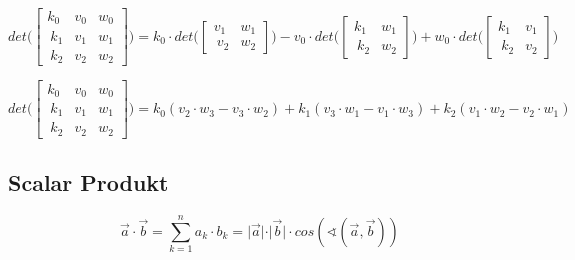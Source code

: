 \begin{equation} 
det \Bigg( \begin{bmatrix}
k_0 & v_0 & w_0 \\\
k_1 & v_1 & w_1 \\\
k_2 & v_2 & w_2
\end{bmatrix} \Bigg) = k_0 \cdot 	det \bigg( \begin{bmatrix}
v_1 & w_1\\\
v_2 & w_2 
\end{bmatrix} \bigg) - v_0 \cdot 	det \bigg( \begin{bmatrix}
k_1 & w_1\\\
k_2 & w_2 
\end{bmatrix} \bigg) + w_0 \cdot 	det \bigg( \begin{bmatrix}
k_1 & v_1\\\
k_2 & v_2 
\end{bmatrix} \bigg)
\end{equation}

\begin{equation} 
det \Bigg( \begin{bmatrix}
k_0 & v_0 & w_0 \\\
k_1 & v_1 & w_1 \\\
k_2 & v_2 & w_2
\end{bmatrix} \Bigg) = k_0 ( v_2 \cdot w_3 - v_3 \cdot w_2 ) + 
k_1 ( v_3 \cdot w_1 - v_1 \cdot w_3 )
+ k_2 (v_1 \cdot w_2 - v_2 \cdot w_1)
\end{equation}



\subsection*{ Scalar Produkt }

\begin{equation}
\overrightarrow{a} \cdot \overrightarrow{b} = \sum_{k=1}^n a_k \cdot b_k  = \vert \overrightarrow{a} \vert \cdot \vert \overrightarrow{b} \vert \cdot cos(\sphericalangle (\overrightarrow{a}, \overrightarrow{b} ))
\end{equation}

